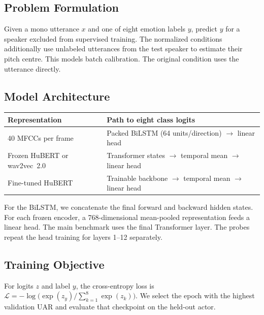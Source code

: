 \documentclass[11pt, letterpaper]{article}
\begin{document}
\subsection{Problem Formulation}
Given a mono utterance $x$ and one of eight emotion labels $y$, predict $y$ for a speaker excluded from supervised training. The normalized conditions additionally use unlabeled utterances from the test speaker to estimate their pitch centre. This models batch calibration. The original condition uses the utterance directly.

\subsection{Model Architecture}
\begin{center}
\small
\begin{tabular}{@{}ll@{}}
\toprule
Representation & Path to eight class logits \\
\midrule
40 MFCCs per frame & Packed BiLSTM (64 units/direction) $\to$ linear head \\
Frozen HuBERT or wav2vec~2.0 & Transformer states $\to$ temporal mean $\to$ linear head \\
Fine-tuned HuBERT & Trainable backbone $\to$ temporal mean $\to$ linear head \\
\bottomrule
\end{tabular}
\end{center}
For the BiLSTM, we concatenate the final forward and backward hidden states. For each frozen encoder, a 768-dimensional mean-pooled representation feeds a linear head. The main benchmark uses the final Transformer layer. The probes repeat the head training for layers 1--12 separately.

\subsection{Training Objective}
For logits $z$ and label $y$, the cross-entropy loss is
$\mathcal L=-\log\bigl(\exp(z_y)/\sum_{k=1}^{8}\exp(z_k)\bigr)$.
We select the epoch with the highest validation UAR and evaluate that checkpoint on the held-out actor.

\clearpage
\end{document}

